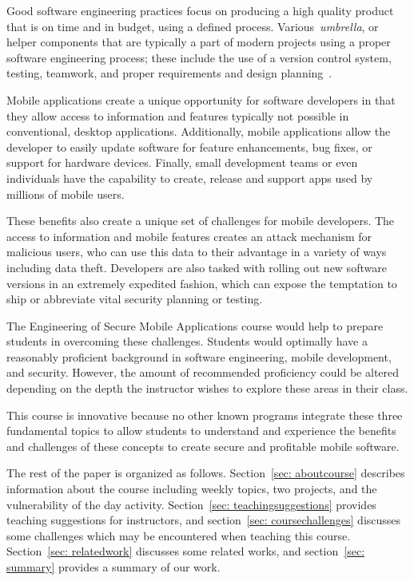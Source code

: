 \documentclass[conference]{IEEEtran}
\begin{document}
Good software engineering practices focus on producing a high quality product that is on time and in budget, using a defined process. Various~\emph{umbrella}, or helper components that are typically a part of modern projects using a proper software engineering process; these include the use of a version control system, testing, teamwork, and proper requirements and design planning~\cite{pressman}.

Mobile applications create a unique opportunity for software developers in that they allow access to information and features typically not possible in conventional, desktop applications. Additionally, mobile applications allow the developer to easily update software for feature enhancements, bug fixes, or support for hardware devices. Finally, small development teams or even individuals have the capability to create, release and support apps used by millions of mobile users.

These benefits also create a unique set of challenges for mobile developers. The access to information and mobile features creates an attack mechanism for malicious users, who can use this data to their advantage in a variety of ways including data theft. Developers are also tasked with rolling out new software versions in an extremely expedited fashion, which can expose the temptation to ship or abbreviate vital security planning or testing.

The Engineering of Secure Mobile Applications course would help to prepare students in overcoming these challenges. Students would optimally have a reasonably proficient background in software engineering, mobile development, and security. However, the amount of recommended proficiency could be altered depending on the depth the instructor wishes to explore these areas in their class.

This course is innovative because no other known programs integrate these three fundamental topics to allow students to understand and experience the benefits and challenges of these concepts to create secure and profitable mobile software.

The rest of the paper is organized as follows. Section~\ref{sec: aboutcourse} describes information about the course including weekly topics, two projects, and the vulnerability of the day activity. Section~\ref{sec: teachingsuggestions} provides teaching suggestions for instructors, and section~\ref{sec: coursechallenges} discusses some challenges which may be encountered when teaching this course. Section~\ref{sec: relatedwork} discusses some related works, and section~\ref{sec: summary} provides a summary of our work.
\end{document}
